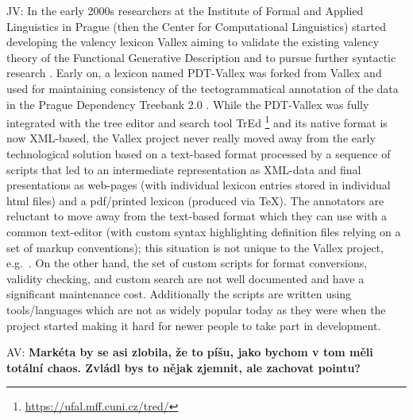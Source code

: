 \documentclass[10pt, a4paper]{article}
\newcommand{\av}[1]{{\color{ansa} AV: #1}}
\newcommand{\jv}[1]{{\color{svlinks} JV: #1}}
\begin{document}
\jv{
In the early 2000s researchers at the Institute of Formal and Applied Linguistics in Prague
(then the Center for Computational Linguistics) started developing the valency lexicon Vallex aiming to
validate the existing valency theory of the Functional Generative Description \cite{Sgall:1986} and to pursue
further syntactic research \cite{LopatkovaEtAl02tektogramaticky}.
Early on, a lexicon named PDT-Vallex was forked from Vallex and used for
maintaining consistency of the tectogrammatical annotation of the data in the
Prague Dependency Treebank 2.0 \cite{PDT2.0,HajicHonetschlager03annotation}.
While the PDT-Vallex was fully integrated with the tree editor and search tool TrEd%
\footnote{\url{https://ufal.mff.cuni.cz/tred/}}
\cite{PajasStepanek08recent}
and its native format is now XML-based,
the Vallex project never really moved away from the early technological solution based on a text-based format
processed by a sequence of scripts that led to an intermediate representation as XML-data
\cite{Zabokrtsky05valency}
and final presentations as web-pages (with individual lexicon entries stored in individual html files)
and a pdf/printed lexicon (produced via TeX).
The annotators are reluctant to move away from the text-based format which they can use with a common text-editor
(with custom syntax highlighting definition files relying on a set of markup conventions);
this situation is not unique to the Vallex project, e.g.\ \cite{Benko19LexiCorp}.
On the other hand, the set of custom scripts for format conversions,
validity checking, and custom search are not well documented and have a significant
maintenance cost. Additionally the scripts are written using tools/languages which are not as widely
popular today as they were when the project started making it hard for newer people to take part
in development.
}

\av{\textbf{Markéta by se asi zlobila, že to píšu, jako bychom v tom měli totální chaos.
Zvládl bys to nějak zjemnit, ale zachovat pointu?}}


\end{document}
